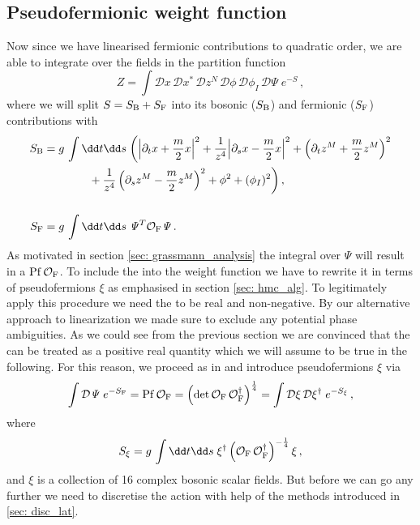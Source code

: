 %
%
%
%
%
%
%
%
%
%
\subsection{Pseudofermionic weight function}
Now since we have linearised fermionic contributions to quadratic order, we are able to integrate over the  fields in the partition function
%
%
\begin{equation}
Z = \int \mathcal{D}x\,\mathcal{D}x^{*}\,\mathcal{D}z^{N}\,\mathcal{D}\phi\,\mathcal{D}\phi_{I}\,\mathcal{D}\mathit{\Psi}\; e^{-S}\,,
\label{eq: Z_string2}
\end{equation}
%
%
where we will split $S = S_{\rm B} + S_{\rm F}$ into its bosonic ($S_{\rm B}$) and fermionic ($S_{\rm F}$) contributions with
%
%
\begin{align}
S_{\rm B} &= g\,\int \dd t\dd s\; \bigg({\left\vert \partial_t {x} + {\frac{m}{2}}{x} \right\vert}^2 + \frac{1}{{ z}^4}{\left\vert \partial_s {x} -\frac{m}{2}{x} \right\vert}^2 + \left(\partial_t {z}^M + \frac{m}{2}{z}^M \right)^2 \notag \\
&\qquad\qquad+ \frac{1}{{ z}^4} \left(\partial_s {z}^M -\frac{m}{2}{z}^M\right)^2 + \phi^2 + (\phi_{I})^{2} \bigg)\,, \label{eq: bos_act} \\[0.5cm]
S_{\rm F} &=  g\,\int \dd t\dd s\; \mathit{\Psi}^T \mathcal{O}_{\rm F} \mathit{\Psi} \,. \notag
\end{align}
%
%
As motivated in section \ref{sec: grassmann_analysis} the  integral over $\mathit{\Psi}$ will result in a  ${\rm Pf}\,\mathcal{O}_{\rm F}$. To include the  into the weight function we have to rewrite it in terms of pseudofermions $\xi$ as emphasised in section \ref{sec: hmc_alg}. To legitimately apply this procedure we need the  to be real and non-negative. By our alternative approach to linearization we made sure to exclude any potential phase ambiguities. As we could see from the previous section we are convinced that the  can be treated as a positive real quantity which we will assume to be true in the following. For this reason, we proceed as in \cite{Roiban} and introduce pseudofermions $\xi$ via
%
%
\begin{equation}
\int \mathcal{D}\mathit{\Psi}\; e^{-S_{\rm F}} = {\rm Pf}\,\mathcal{O}_{\rm F} =\left( \det \mathcal{O}_{\rm F}\,\mathcal{O}_{\rm F}^{\dagger} \right)^{\frac{1}{4}} = \int \mathcal{D}\xi\,\mathcal{D}\xi^{\dagger}\; e^{-S_{\xi}}\,,
\end{equation}
%
%
where
%
%
\begin{equation}
S_{\xi} = g\,\int \dd t\dd s \; \xi^{\dagger} \left(\mathcal{O}_{\rm F}\,\mathcal{O}_{\rm F}^{\dagger} \right)^{-\frac{1}{4}} \xi \,,
\label{eq: S_xi}
\end{equation}
and $\xi$ is a collection of 16 complex bosonic scalar fields. But before we can go any further we need to discretise the action with help of the methods introduced in \autoref{sec: disc_lat}.
%
%
%
%
%
%
%
%
%
%
